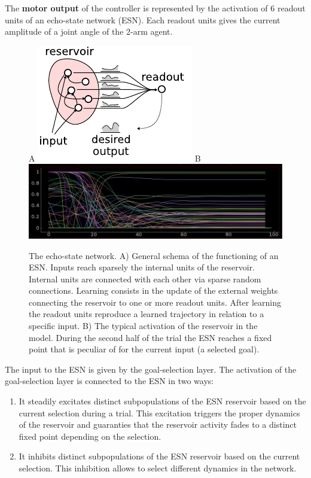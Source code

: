 \documentclass[11pt]{article}
\begin{document}
The \textbf{motor output} of the controller is represented by the
activation of 6 readout units of an echo-state network (ESN). Each readout
units gives the current amplitude of a joint angle of the 2-arm agent. 
%
\begin{figure}[H]
    \centering
    A \includegraphics[width=.3\textwidth]{reservoir}
    B \includegraphics[width=.6\textwidth]{ESN}
    \caption{
        The echo-state network. A) General schema of the functioning of an ESN.
        Inputs reach sparsely the internal units of the reservoir.  Internal
        units are connected with each other via sparse random connections.
        Learning consists in the update of the external weights connecting the
        reservoir to one or more readout units. After learning the readout units
        reproduce a learned trajectory in relation to a specific input.
        B) The typical activation of the reservoir in the model. During the second 
        half of the trial the ESN reaches a fixed point that is peculiar of for 
        the current input (a selected goal).
    }
    \label{fig:esn}
\end{figure}
%
The input to the ESN is given by the goal-selection layer. The activation of
the goal-selection layer is connected to the ESN in two ways: 

\begin{enumerate}

    \item It steadily excitates distinct subpopulations of the ESN
        reservoir based on the current selection during a trial. This
        excitation triggers the proper dynamics of the reservoir and
        guaranties that the reservoir activity fades to a distinct fixed
        point depending on the selection.

    \item It inhibits distinct subpopulations of the ESN reservoir based on
        the current selection. This inhibition allows to select different
        dynamics in the network.

\end{enumerate}
\end{document}
